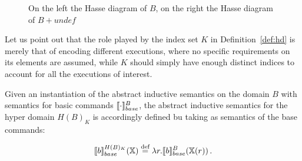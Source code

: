 \documentclass[
  10pt,       %
  twoside,    %
  a4paper,    %
  english,    %
  tikz,       %
  openright,  %
]{book}
\begin{document}
\begin{figure}[t]\label{fig:hd}
\begin{center}
\qquad
\qquad
\qquad
{}
\end{center}
\caption{On the left the Hasse diagram of $B$, on the right the Hasse diagram of
$B + undef$}
\end{figure}
 
Let us point out that the role played by the index set 
$K$ in Definition~\ref{def:hd} is merely that of encoding different executions, where no specific
requirements on its elements are assumed, while $K$ should simply have enough distinct indices to account
for all the executions of interest. 

\begin{definition}
  Given an instantiation of the abstract inductive semantics on the domain $B$ with
  semantics for basic commands $\llbracket \cdot \rrbracket_{base}^B$, the abstract inductive
  semantics for the hyper domain $H(B)_K$ is accordingly defined bu taking
  as semantics of the base commands:

  $$\llbracket b \rrbracket_{base}^{H(B)_K}(\mathbb{X}) \stackrel{\text{def}}{=} \lambda r . \llbracket b \rrbracket_{base}^B(\mathbb{X}(r))\, .$$
\end{definition}
\end{document}
